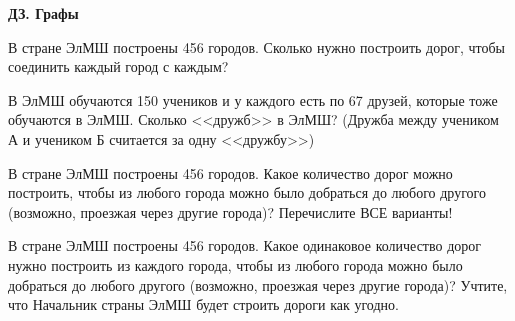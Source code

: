 \centerline{\bf \Huge ДЗ. Графы}

 В стране ЭлМШ построены 456 городов. Сколько нужно построить дорог, чтобы соединить каждый город с каждым?

 В ЭлМШ обучаются 150 учеников и у каждого есть по 67 друзей, которые тоже обучаются в ЭлМШ. Сколько <<дружб>> в ЭлМШ? (Дружба между учеником А и учеником Б считается за одну <<дружбу>>)

 В стране ЭлМШ построены 456 городов. Какое количество дорог можно построить, чтобы из любого города можно было добраться до любого другого (возможно, проезжая через другие города)? Перечислите ВСЕ варианты!

 В стране ЭлМШ построены 456 городов. Какое одинаковое количество дорог нужно построить из каждого города, чтобы из любого города можно было добраться до любого другого (возможно, проезжая через другие города)? Учтите, что Начальник страны ЭлМШ будет строить дороги как угодно.

